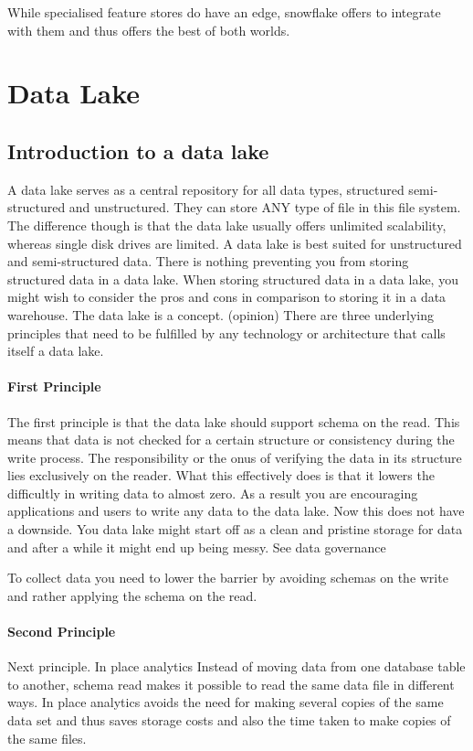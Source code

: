 \documentclass[a4paper, 11pt]{article}
\begin{document}
    While specialised feature stores do have an edge, snowflake offers to integrate with them and thus offers the best of both worlds.


    \section{Data Lake}

    \subsection{Introduction to a data lake}
    A data lake serves as a central repository for all data types, structured semi-structured and unstructured.
    They can store ANY type of file in this file system.
    The difference though is that the data lake usually offers unlimited scalability, whereas single disk drives are limited.
    A data lake is best suited for unstructured and semi-structured data.
    There is nothing preventing you from storing structured data in a data lake.
    When storing structured data in a data lake, you might wish to consider the pros and cons in comparison to storing it in a data warehouse.
    The data lake is a concept.
    (opinion) There are three underlying principles that need to be fulfilled by any technology or architecture that calls itself a data lake.

    \paragraph{First Principle}
    The first principle is that the data lake should support schema on the read.
    This means that data is not checked for a certain structure or consistency during the write process.
    The responsibility or the onus of verifying the data in its structure lies exclusively on the reader.
    What this effectively does is that it lowers the difficultly in writing data to almost zero.
    As a result you are encouraging applications and users to write any data to the data lake. %
    Now this does not have a downside.
    You data lake might start off as a clean and pristine storage for data and after a while it might end up being messy.
    See data governance

    To collect data you need to lower the barrier by avoiding schemas on the write and rather applying the schema on the read.

    \paragraph{Second Principle}
    Next principle.
    In place analytics
    Instead of moving data from one database table to another, schema read makes it possible to read the same data file in different ways.
    In place analytics avoids the need for making several copies of the same data set and thus saves storage costs and also the time taken to make copies of the same files.
\end{document}
